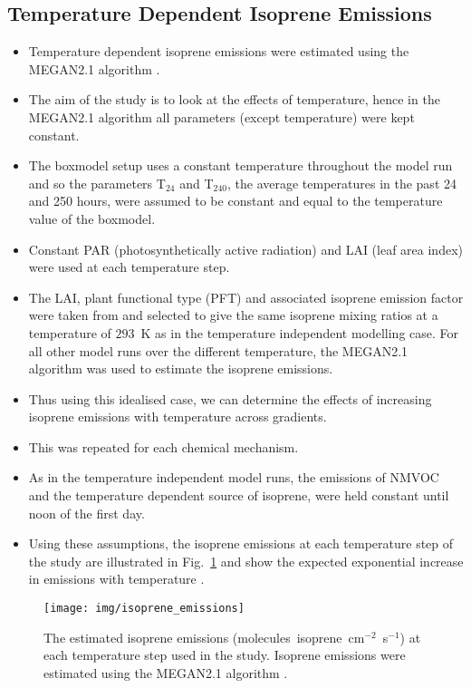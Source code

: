 \subsection{Temperature Dependent Isoprene Emissions}
\begin{itemize}
    \item Temperature dependent isoprene emissions were estimated using the MEGAN2.1 algorithm \citep{Guenther:2012}.
    \item The aim of the study is to look at the effects of temperature, hence in the MEGAN2.1 algorithm all parameters (except temperature) were kept constant.
    \item The boxmodel setup uses a constant temperature throughout the model run and so the parameters T$_{24}$ and T$_{240}$, the average temperatures in the past 24 and 250 hours, were assumed to be constant and equal to the temperature value of the boxmodel.
    \item Constant PAR (photosynthetically active radiation) and LAI (leaf area index) were used at each temperature step.
    \item The LAI, plant functional type (PFT) and associated isoprene emission factor were taken from \citet{Guenther:2012} and selected to give the same isoprene mixing ratios at a temperature of $293$~K as in the temperature independent modelling case. For all other model runs over the different temperature, the MEGAN2.1 algorithm was used to estimate the isoprene emissions.
    \item Thus using this idealised case, we can determine the effects of increasing isoprene emissions with temperature across  gradients.
    \item This was repeated for each chemical mechanism.
    \item As in the temperature independent model runs, the emissions of NMVOC and the temperature dependent source of isoprene, were held constant until noon of the first day.
    \item Using these assumptions, the isoprene emissions at each temperature step of the study are illustrated in Fig.~\ref{f:isoprene_emissions} and show the expected exponential increase in emissions with temperature \citep{Guenther:2006}.
\end{itemize}
\begin{figure}[ht]%
    \centering%
    \caption{The estimated isoprene emissions (molecules~isoprene~cm$^{-2}$~s$^{-1}$) at each temperature step used in the study. Isoprene emissions were estimated using the MEGAN2.1 algorithm \citep{Guenther:2012}.}
    \label{f:isoprene_emissions}%
    \texttt{[image: img/isoprene\_emissions]}
\end{figure}

